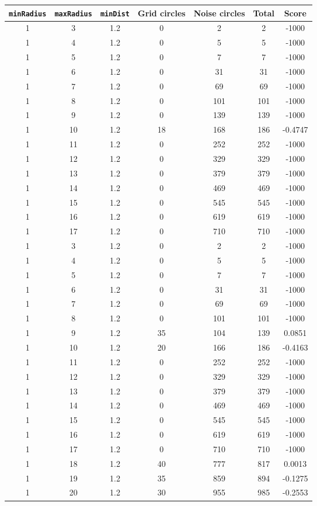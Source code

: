 \documentclass[letterpaper, 12pt]{article}
\begin{document}
\begin{longtable}{|c|c|c|c|c|c|c|}
\hline
\textbf{\texttt{minRadius}} & \textbf{\texttt{maxRadius}} & \textbf{\texttt{minDist}} & \textbf{Grid circles} & \textbf{Noise circles} & \textbf{Total} & \textbf{Score} \\
\hline
1 & 3 & 1.2 & 0 & 2 & 2 & -1000 \\
\hline
1 & 4 & 1.2 & 0 & 5 & 5 & -1000 \\
\hline
1 & 5 & 1.2 & 0 & 7 & 7 & -1000 \\
\hline
1 & 6 & 1.2 & 0 & 31 & 31 & -1000 \\
\hline
1 & 7 & 1.2 & 0 & 69 & 69 & -1000 \\
\hline
1 & 8 & 1.2 & 0 & 101 & 101 & -1000 \\
\hline
1 & 9 & 1.2 & 0 & 139 & 139 & -1000 \\
\hline
1 & 10 & 1.2 & 18 & 168 & 186 & -0.4747 \\
\hline
1 & 11 & 1.2 & 0 & 252 & 252 & -1000 \\
\hline
1 & 12 & 1.2 & 0 & 329 & 329 & -1000 \\
\hline
1 & 13 & 1.2 & 0 & 379 & 379 & -1000 \\
\hline
1 & 14 & 1.2 & 0 & 469 & 469 & -1000 \\
\hline
1 & 15 & 1.2 & 0 & 545 & 545 & -1000 \\
\hline
1 & 16 & 1.2 & 0 & 619 & 619 & -1000 \\
\hline
1 & 17 & 1.2 & 0 & 710 & 710 & -1000 \\
\hline
1 & 3 & 1.2 & 0 & 2 & 2 & -1000 \\
\hline
1 & 4 & 1.2 & 0 & 5 & 5 & -1000 \\
\hline
1 & 5 & 1.2 & 0 & 7 & 7 & -1000 \\
\hline
1 & 6 & 1.2 & 0 & 31 & 31 & -1000 \\
\hline
1 & 7 & 1.2 & 0 & 69 & 69 & -1000 \\
\hline
1 & 8 & 1.2 & 0 & 101 & 101 & -1000 \\
\hline
1 & 9 & 1.2 & 35 & 104 & 139 & 0.0851 \\
\hline
1 & 10 & 1.2 & 20 & 166 & 186 & -0.4163 \\
\hline
1 & 11 & 1.2 & 0 & 252 & 252 & -1000 \\
\hline
1 & 12 & 1.2 & 0 & 329 & 329 & -1000 \\
\hline
1 & 13 & 1.2 & 0 & 379 & 379 & -1000 \\
\hline
1 & 14 & 1.2 & 0 & 469 & 469 & -1000 \\
\hline
1 & 15 & 1.2 & 0 & 545 & 545 & -1000 \\
\hline
1 & 16 & 1.2 & 0 & 619 & 619 & -1000 \\
\hline
1 & 17 & 1.2 & 0 & 710 & 710 & -1000 \\
\hline
1 & 18 & 1.2 & 40 & 777 & 817 & 0.0013 \\
\hline
1 & 19 & 1.2 & 35 & 859 & 894 & -0.1275 \\
\hline
1 & 20 & 1.2 & 30 & 955 & 985 & -0.2553 \\
\hline
\end{longtable}
\end{document}
